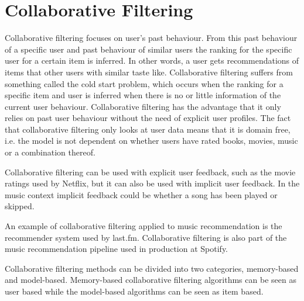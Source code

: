 \documentclass[a4paper,11pt]{kth-mag}
\begin{document}
\section{Collaborative Filtering}
Collaborative filtering focuses on user's past behaviour. From this past behaviour of a specific user and past behaviour of similar users the ranking for the specific user for a certain item is inferred\cite{sarwar2001item}\cite{su2009survey}. In other words, a user gets recommendations of items that other users with similar taste like\cite{adomavicius2005toward}. Collaborative filtering suffers from something called the cold start problem, which occurs when the ranking for a specific item and user is inferred when there is no or little information of the current user behaviour\cite{herlocker2004evaluating}. Collaborative filtering has the advantage that it only relies on past user behaviour without the need of explicit user profiles. The fact that collaborative filtering only looks at user data means that it is domain free, i.e. the model is not dependent on whether users have rated books, movies, music or a combination thereof\cite{hu2008collaborative}.

Collaborative filtering can be used with explicit user feedback, such as the movie ratings used by Netflix, but it can also be used with implicit user feedback\cite{hu2008collaborative}. In the music context implicit feedback could be whether a song has been played or skipped.

An example of collaborative filtering applied to music recommendation is the recommender system used by last.fm. Collaborative filtering is also part of the music recommendation pipeline used in production at Spotify.

Collaborative filtering methods can be divided into two categories, memory-based and model-based. Memory-based collaborative filtering algorithms can be seen as user based while the model-based algorithms can be seen as item based\cite{sarwar2001item}.
\end{document}
